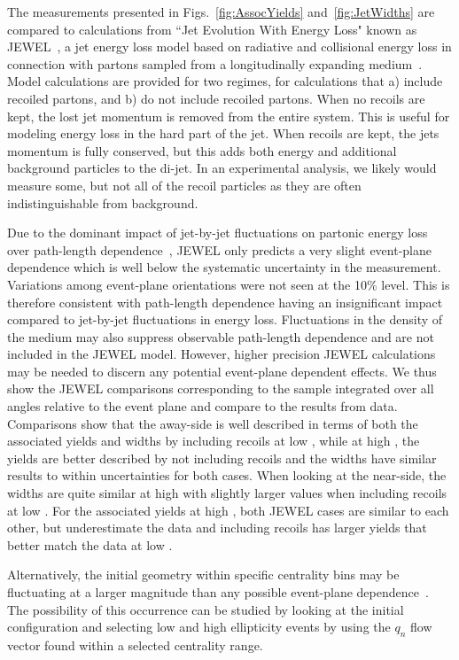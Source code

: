 The measurements presented in Figs.~\ref{fig:AssocYields} and~\ref{fig:JetWidths} are compared to calculations from ``Jet Evolution With Energy Loss" known as JEWEL~\cite{Zapp_2009}, a jet energy loss model based on radiative and collisional energy loss in connection with partons sampled from a longitudinally expanding  medium~\cite{Zapp:2013vla}. Model calculations are provided for two regimes, for calculations that
a) include recoiled partons, and b) do not include recoiled partons. When no recoils are kept, the lost jet momentum is removed from the entire system.  This is useful for modeling energy loss in the hard part of the jet.  When recoils are kept, the jets momentum is fully conserved, but this adds both energy and additional background particles to the di-jet.  In an experimental analysis, we likely would measure some, but not all of the recoil particles as they are often indistinguishable from background.

Due to the dominant impact of jet-by-jet fluctuations on partonic energy loss over path-length dependence~\cite{Milhano:2015mng,Zapp:2013zya}, JEWEL only predicts a very slight event-plane dependence which is well below the systematic uncertainty in the measurement.  Variations among event-plane orientations were not seen at the 10\% level.  This is therefore consistent with path-length dependence having an insignificant impact compared to jet-by-jet fluctuations in energy loss.  Fluctuations in the density of the medium may also suppress observable path-length dependence and are not included in the JEWEL model.  However,  higher precision JEWEL calculations may be needed to discern any potential event-plane dependent effects.  We thus show the JEWEL comparisons corresponding to the sample integrated over all angles relative to the event plane and compare to the results from data.  Comparisons show that the away-side is well described in terms of both the associated yields and widths by including recoils at low , while at high , the yields are better described by not including recoils and the widths have similar results to within uncertainties for both cases.  When looking at the near-side, the widths are quite similar at high  with slightly larger values when including recoils at low .  For the associated yields at high , both JEWEL cases are similar to each other, but underestimate the data and including recoils has larger yields that better match the data at low .

Alternatively, the initial geometry within specific centrality bins may be fluctuating at a larger magnitude than any possible event-plane dependence~\cite{Noronha-Hostler-RAAv2,PhysRevLett.116.252301}.  The possibility of this occurrence can be studied by looking at the initial configuration and selecting low and high ellipticity events by  using the $q_n$ flow vector found within a selected centrality range.

